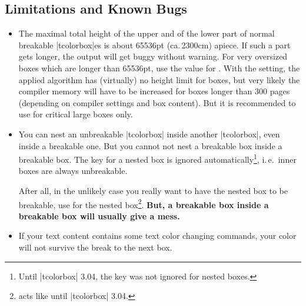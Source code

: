 \subsection{Limitations and Known Bugs}
\begin{itemize}
\item  The maximal total height of the upper and of the lower part
  of normal breakable |tcolorbox|es is about 65536pt (ca.\,2300cm)
  apiece. If such a part gets longer, the output will get buggy
  without warning.
  For very oversized boxes which are longer than 65536pt, use
  the  value for  .
  With the  setting,
  the applied algorithm has (virtually) no height limit for boxes, but
  very likely the compiler memory will have to be increased for boxes longer
  than 300 pages (depending on compiler settings and box content).
  But it is recommended to use  for critical large boxes only.
\item You can nest an unbreakable |tcolorbox| inside another |tcolorbox|,
  even inside a breakable one.
  But you cannot not nest a breakable box inside a breakable box.
  The  key for a nested box is ignored
  automatically\footnote{Until |tcolorbox| 3.04, the  key
  was not ignored for nested boxes.}, i.\,e.\ inner
  boxes are always unbreakable.\par
  After all, in the unlikely case you really want to have the nested box to be breakable,
  use  for the nested
  box\footnote{  acts like  until |tcolorbox| 3.04.}.
  \textbf{But, a breakable box inside a breakable box will usually give a mess.}

\item If your text content contains some text color changing commands,
  your color will not survive the break to the next box.
\end{itemize}


\clearpage
